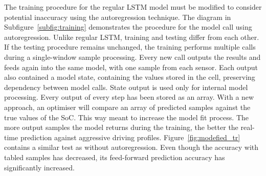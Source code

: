 %
%
The training procedure for the regular LSTM model must be modified to consider potential inaccuracy using the autoregression technique.
The diagram in \mbox{Subfigure~\ref{subfig:training}} demonstrates the procedure for the model call using autoregression.
Unlike regular LSTM, training and testing differ from each other.
If the testing procedure remains unchanged, the training performs multiple calls during a single-window sample processing.
Every new call outputs the results and feeds again into the same model, with one sample from each sensor.
Each output also contained a model state, containing the values stored in the cell, preserving dependency between model calls.
State output is used only for internal model processing.
Every output of every step has been stored as an array.
With a new approach, an optimiser will compare an array of predicted samples against the true values of the SoC.
This way meant to increase the model fit process.
The more output samples the model returns during the training, the better the real-time prediction against aggressive driving profiles.
\mbox{Figure~\ref{fig:modefied_tr}} contains a similar test as without autoregression.
Even though the accuracy with tabled samples has decreased, its feed-forward prediction accuracy has significantly increased.
